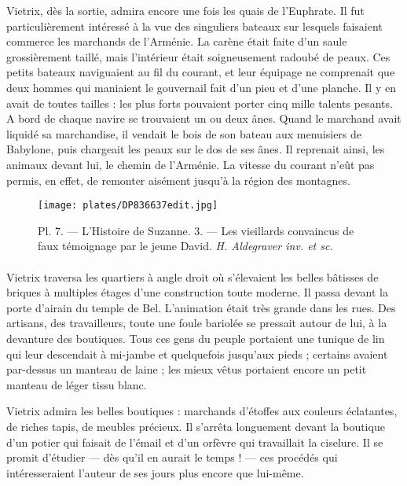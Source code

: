 \documentclass[a4paper, 11pt, oneside, polutonikogreek, french]{article}
\begin{document}
Vietrix, dès la sortie, admira encore une fois les quais de l'Euphrate. Il fut particulièrement intéressé à la vue des singuliers bateaux sur lesquels faisaient commerce les marchands de l'Arménie. La carène était faite d'un saule grossièrement taillé, mais l'intérieur était soigneusement radoubé de peaux. Ces petits bateaux naviguaient au fil du courant, et leur équipage ne comprenait que deux hommes qui maniaient le gouvernail fait d'un pieu et d'une planche. Il y en avait de toutes tailles : les plus forts pouvaient porter cinq mille talents pesants. A bord de chaque navire se trouvaient un ou deux ânes. Quand le marchand avait liquidé sa marchandise, il vendait le bois de son bateau aux menuisiers de Babylone, puis chargeait les peaux sur le dos de ses ânes. Il reprenait ainsi, les animaux devant lui, le chemin de l'Arménie. La vitesse du courant n'eût pas permis, en effet, de remonter aisément jusqu'à la région des montagnes.

\bigskip
\centerline{\EightStarTaper}
\centerline{\EightStarTaper\EightStarTaper}
\bigskip
\clearpage
\vspace*{\fill}
\begin{figure}[H]
\centering
\texttt{[image: plates/DP836637edit.jpg]}
\caption{Pl. 7. --- L'Histoire de Suzanne. 3. --- Les vieillards convaincus de faux témoignage par le jeune David. \emph{H. Aldegraver inv. et sc.}}
\end{figure}
\vspace*{\fill}
\clearpage
\paragraph{}
Vietrix traversa les quartiers à angle droit où s'élevaient les belles bâtisses de briques à multiples étages d'une construction toute moderne. Il passa devant la porte d'airain du temple de Bel. L'animation était très grande dans les rues. Des artisans, des travailleurs, toute une foule bariolée se pressait autour de lui, à la devanture des boutiques. Tous ces gens du peuple portaient une tunique de lin qui leur descendait à mi-jambe et quelquefois jusqu'aux pieds ; certains avaient par-dessus un manteau de laine ; les mieux vêtus portaient encore un petit manteau de léger tissu blanc.

Vietrix admira les belles boutiques : marchands d'étoffes aux couleurs éclatantes, de riches tapis, de meubles précieux. Il s'arrêta longuement devant la boutique d'un potier qui faisait de l'émail et d'un orfèvre qui travaillait la ciselure. Il se promit d'étudier --- dès qu'il en aurait le temps ! --- ces procédés qui intéresseraient l'auteur de ses jours plus encore que lui-même.
\end{document}
